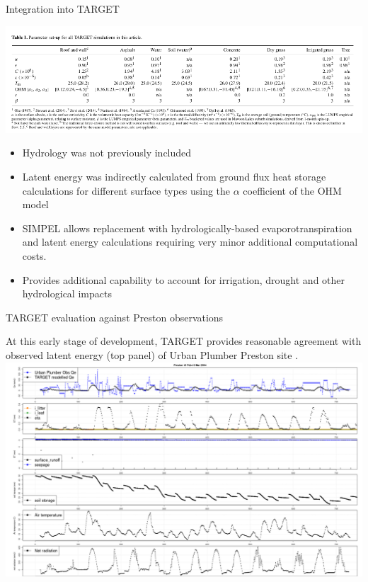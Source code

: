 \documentclass{beamer}
\begin{document}
\begin{frame}{Integration into TARGET} 

\includegraphics[scale=0.45]{TARGET3.png}

\begin{itemize}
\item Hydrology was not previously included
\item Latent energy was indirectly calculated from ground flux heat storage calculations for different surface types using the $\alpha$ coefficient of the OHM model
\item SIMPEL allows replacement with hydrologically-based evaporotranspiration and latent energy calculations requiring very minor additional computational costs.
\item Provides additional capability to account for irrigation, drought and other hydrological impacts
\end{itemize}
\end{frame}


\begin{frame}{TARGET evaluation against Preston observations} 

{\footnotesize At this early stage of development, TARGET provides reasonable agreement with observed latent energy (top panel) of Urban Plumber Preston site {\footnotesize \citep{Coutts2007}}.}
\\
\includegraphics[scale=0.20]{PrestonFeb2004_4mmIrr_ground.png}
\end{frame}
\end{document}
